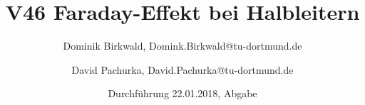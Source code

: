 
\title{V46 Faraday-Effekt bei Halbleitern}
\author{Dominik Birkwald, Domink.Birkwald@tu-dortmund.de \and David Pachurka, David.Pachurka@tu-dortmund.de}
\date{Durchführung 22.01.2018, Abgabe }



  \maketitle
  
  
  
  



